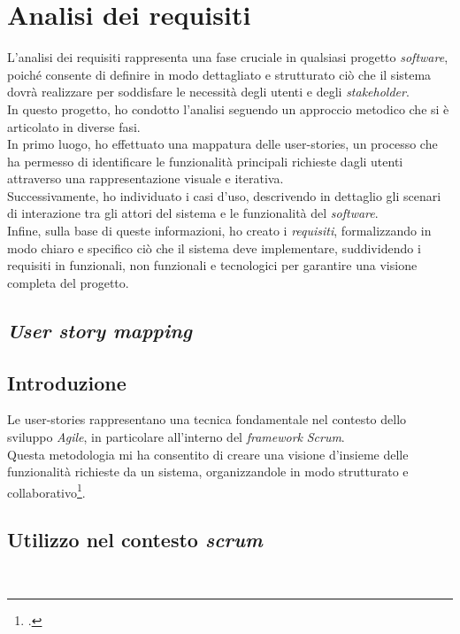 \pagebreak
\section{Analisi dei requisiti}
\label{sez:analisi-dei-requisiti}
L’analisi dei requisiti rappresenta una fase cruciale in qualsiasi progetto \textit{software}, poiché consente di definire in modo dettagliato e strutturato ciò che il sistema dovrà realizzare per soddisfare le necessità degli utenti e degli \textit{stakeholder}.\\
In questo progetto, ho condotto l’analisi seguendo un approccio metodico che si è articolato in diverse fasi.\\

\noindent In primo luogo, ho effettuato una mappatura delle \gls{user-stories}, un processo che ha permesso di identificare le funzionalità principali richieste dagli utenti attraverso una rappresentazione visuale e iterativa. \\
Successivamente, ho individuato i casi d’uso, descrivendo in dettaglio gli scenari di interazione tra gli attori del sistema e le funzionalità del \textit{software}.\\
Infine, sulla base di queste informazioni, ho creato i \textit{requisiti}, formalizzando in modo chiaro e specifico ciò che il sistema deve implementare, suddividendo i requisiti in funzionali, non funzionali e tecnologici per garantire una visione completa del progetto.
\subsection{\textit{User story mapping}}
\label{subsec:user-story-mapping}

\subsection*{Introduzione}
\label{subsubsec:introduzione}

Le \gls{user-stories} rappresentano una tecnica fondamentale nel contesto dello sviluppo \textit{Agile}, in particolare all'interno del \textit{framework} \textit{Scrum}. \\
Questa metodologia mi ha consentito di creare una visione d'insieme delle funzionalità richieste da un sistema, organizzandole in modo strutturato e collaborativo\footcite{site:user-stories}. \\

\subsection*{Utilizzo nel contesto \textit{scrum}}\\

